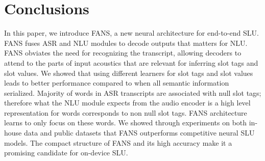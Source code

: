 \documentclass[a4paper]{article}
\begin{document}
\iffalse
As the results in Table 2 and 3 indicate the IRER for joint ASR NLU models is lower than the other models.  We conducted an experiment to  investigate impact of ASR error on the NLU outputs. Ideally, if we can get the transcript with no WER, the SLU system becomes an NLU where already the state of the art results reported using transformer based neural architectures (e.g. see \cite{wang2020encoding} and references therein). In our experiments, we injected synthetically generated error into the transcripts of the FSC data to resemble the WER introduced by  ASR in the  joint ASR-NLU SLU model and measured the slot tag errors. Figure~\ref{fig:WERNLU}) illustrates the slot tag error when WER increases from 0\% to 10\%.
We can see from the figure slot tag accuracy is very sensitive to ASR outputs even for FSC data for which we have three slot tags. This observation suggests that  the ASR-NLU SLU models require a reliable ASR module for which  increasing ASR model size and using more training data are two requirement which in turn introduce challenges in on-device SLU where we have limited computational resources and data.

\begin{figure}[t]
  \centering
  \texttt{[image: iFIG4.png]}
  \caption{ The impact of WER on slot tag error rate for ASR +NLU SLU architecture. The NLU output is very sensitive to ASR output. }
  \label{fig:WERNLU}
\end{figure}
\fi
\section{Conclusions}
In this paper, we introduce FANS, a new neural architecture for end-to-end SLU. FANS fuses ASR and NLU modules to decode outputs that matters for NLU. FANS obviates the need for recognizing the transcript, allowing decoders  to attend to the parts of input acoustics that are relevant for inferring slot tags and slot values.  We showed that using different learners for slot tags and slot values leads to better performance compared to when all semantic information serialized.  Majority of words in ASR transcripts are  associated with  null slot tags; therefore what the NLU module expects from the audio encoder is a high level representation for words corresponds to non null slot tags. FANS architecture learns to only focus on these words.  We showed through experiments on both in-house data and public datasets that FANS outperforms competitive neural SLU models. The compact structure of FANS and its high accuracy make it a promising candidate for on-device SLU.





\end{document}

